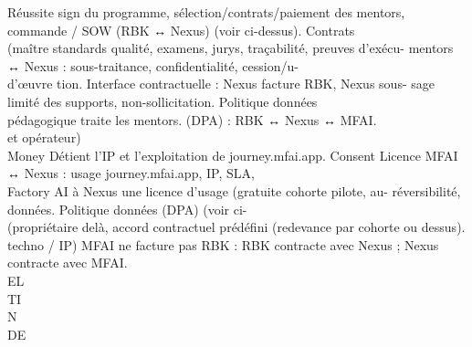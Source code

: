 Réussite          sign du programme, sélection/contrats/paiement des mentors, commande / SOW (RBK ↔ Nexus) (voir ci-dessus). Contrats\\
(maître           standards qualité, examens, jurys, traçabilité, preuves d’exécu- mentors ↔ Nexus : sous-traitance, confidentialité, cession/u-\\
d’œuvre           tion. Interface contractuelle : Nexus facture RBK, Nexus sous- sage limité des supports, non-sollicitation. Politique données\\
pédagogique       traite les mentors.                                              (DPA) : RBK ↔ Nexus ↔ MFAI.\\
et opérateur)\\
\vspace{0.5em}
Money             Détient l’IP et l’exploitation de journey.mfai.app. Consent Licence MFAI ↔ Nexus : usage journey.mfai.app, IP, SLA,\\
Factory AI        à Nexus une licence d’usage (gratuite cohorte pilote, au- réversibilité, données. Politique données (DPA) (voir ci-\\
(propriétaire     delà, accord contractuel prédéfini (redevance par cohorte ou dessus).\\
techno / IP)      MFAI ne facture pas RBK : RBK contracte avec Nexus ; Nexus\\
contracte avec MFAI.\\
\vspace{0.5em}
\vspace{0.5em}
\vspace{0.5em}
\vspace{0.5em}
EL\\
TI\\
N\\
DE\\

